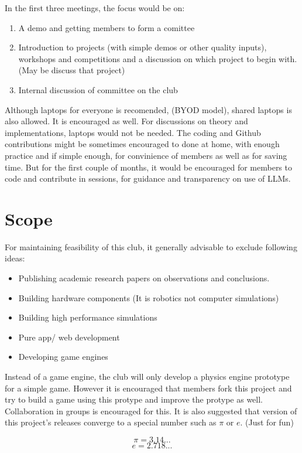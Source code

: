 \documentclass{article}
\begin{document}
In the first three meetings, the focus would be on:

\begin{enumerate}
\item A demo and getting members to form a comittee
\item Introduction to projects (with simple demos or other quality inputs), workshops and competitions and a discussion on which project to begin with. (May be discuss that project)
\item Internal discussion of committee on the club 
 \end{enumerate}
 
Although laptops for everyone is recomended, (BYOD model), shared laptops is also allowed. It is encouraged as well. For discussions on theory and implementations, laptops would not be needed. The coding and Github contributions might be sometimes encouraged to done at home, with enough practice and if simple enough, for convinience of members as well as for saving time. But for the first couple of months, it would be encouraged for members to code and contribute in sessions, for guidance and transparency on use of LLMs.

\section{Scope}

For maintaining feasibility of this club, it generally advisable to exclude following ideas:
\begin{itemize}
\item Publishing academic research papers on observations and conclusions.
\item Building hardware components (It is robotics not computer simulations)
\item Building high performance simulations
\item Pure app/ web development
\item Developing game engines
\end{itemize}

Instead of a game engine, the club will only develop a physics engine prototype for a simple game. However it is encouraged that members fork this project and try to build a game using this protype and improve the protype as well. Collaboration in groups is encouraged for this. It is also suggested that version of this project's releases converge to a special number such as $ \pi $ or $ e $. (Just for fun)

$$ \pi = 3.14 ... $$
$$ e = 2.718 ... $$
 
\end{document}
